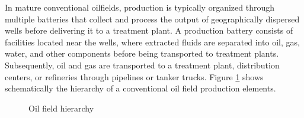 In mature conventional oilfields, production is typically organized through multiple batteries that collect and process the output of geographically dispersed wells before delivering it to a treatment plant. A production battery consists of facilities located near the wells, where extracted fluids are separated into oil, gas, water, and other components before being transported to treatment plants. Subsequently, oil and gas are transported to a treatment plant, distribution centers, or refineries through pipelines or tanker trucks. Figure \ref{fig:deploy} shows schematically the hierarchy of a conventional oil field production elements.

\begin{figure}
    \centering
    
    \caption{Oil field hierarchy}
    \label{fig:deploy}
\end{figure}


